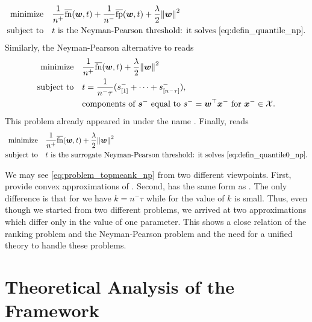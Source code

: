 \begin{equation}\label{eq:problem_grill_np}
  \begin{aligned}
  \minimize
  & \quad \frac{1}{n^{+}}\fns(\bm{w}, t) + \frac{1}{n^{-}}\fps(\bm{w}, t) + \frac{\lambda}{2}\norm{\bm{w}}^2\\
  \st
  & \quad t\text{ is the Neyman-Pearson threshold: it solves }\eqref{eq:defin_quantile_np}.
  \end{aligned}
\end{equation}
Similarly, the Neyman-Pearson alternative to \TopMeanK reads
\begin{equation}\label{eq:problem_topmeank_np}
  \begin{aligned}
  \minimize
  & \quad\frac{1}{n^{+}}\fns(\bm{w}, t) + \frac{\lambda}{2}\norm{\bm{w}}^2 \\
  \st
  & \quad t = \frac 1{n^ - \tau}(s_{[1]}^- + \dots + s_{[n^- \tau]}^-), \\
  & \quad \text{components of }\bm{s}^-\text{ equal to } s^- = \bm{w}^\top \bm{x}^-\text{ for }\bm{x}^- \in \Xc.
  \end{aligned}
\end{equation}
This problem already appeared in \cite{zhang2018tau} under the name \tauFPL. Finally, \PatMatNP reads
\begin{equation}\label{eq:problem_patmat_np}
  \begin{aligned}
  \minimize
  & \quad \frac{1}{n^{+}}\fns(\bm{w},t) + \frac{\lambda}{2}\norm{\bm{w}}^2\\
  \st
  & \quad t\text{ is the surrogate Neyman-Pearson threshold: it solves }\eqref{eq:defin_quantile0_np}.
  \end{aligned}
\end{equation}

We may see \eqref{eq:problem_topmeank_np} from two different viewpoints. First, \tauFPL provide convex approximations of \GrillNP. Second, \tauFPL has the same form as \TopPushK. The only difference is that for \tauFPL we have $k=n^-\tau$ while for \TopPushK the value of $k$ is small. Thus, even though we started from two different problems, we arrived at two approximations which differ only in the value of one parameter. This shows a close relation of the ranking problem and the Neyman-Pearson problem and the need for a unified theory to handle these problems.

\section{Theoretical Analysis of the Framework}\label{sec:theory}

